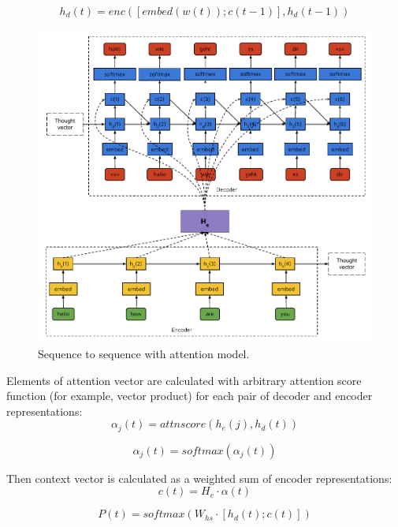 \begin{equation}
h_d(t) = enc([embed(w(t));c(t-1)], h_d(t-1))
\label{attn:hd}
\end{equation}

\begin{figure}
\centering
\includegraphics{Figures/seq2seq}
\decoRule
\caption[Sequence to sequence model]{Sequence to sequence with attention model.}
\label{fig:seq2seq}
\end{figure}

Elements of attention vector are calculated with arbitrary attention score function (for example, vector product) for each pair of decoder and encoder representations:
\begin{equation}
\alpha_j(t) = attnscore(h_e(j), h_d(t))
\label{attn:alpha}
\end{equation}

\begin{equation}
\alpha_j(t) = softmax(\alpha_j(t))
\label{attn:alpha2}
\end{equation}

Then context vector is calculated as a weighted sum of encoder representations:
\begin{equation}
	c(t) = H_e\cdot\alpha(t)
	\label{attn:c}
\end{equation}

\begin{equation}
	P(t) = softmax(W_{hs}\cdot[h_d(t);c(t)])
\label{attn:P}
\end{equation}

